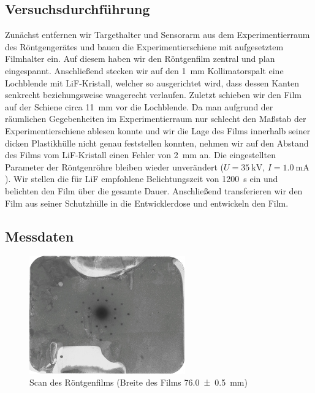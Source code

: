 \documentclass[11pt, a4paper]{article}
\begin{document}
\subsection{Versuchsdurchführung}
Zunächst entfernen wir Targethalter und Sensorarm aus dem Experimentierraum des Röntgengerätes und bauen die Experimentierschiene mit aufgesetztem Filmhalter ein.
Auf diesem haben wir den Röntgenfilm zentral und plan eingespannt.
Anschließend stecken wir auf den \SI{1}{\milli\metre} Kollimatorspalt eine Lochblende mit LiF-Kristall, welcher so ausgerichtet wird, dass dessen Kanten senkrecht beziehungsweise waagerecht verlaufen.
Zuletzt schieben wir den Film auf der Schiene circa \SI{11}{\milli\metre} vor die Lochblende.
Da man aufgrund der räumlichen Gegebenheiten im Experimentierraum nur schlecht den Maßstab der Experimentierschiene ablesen konnte und wir die Lage des Films innerhalb seiner dicken Plastikhülle nicht genau feststellen konnten, nehmen wir auf den Abstand des Films vom LiF-Kristall einen Fehler von \SI{2}{\milli\metre} an.
Die eingestellten Parameter der Röntgenröhre bleiben wieder unverändert ($U = \SI{35}{\kilo\volt}$, $I = \SI{1,0}{\milli\ampere}$).
Wir stellen die für LiF empfohlene Belichtungszeit von \SI{1200}{\second} ein und belichten den Film über die gesamte Dauer.
Anschließend transferieren wir den Film aus seiner Schutzhülle in die Entwicklerdose und entwickeln den Film.

\newpage
\subsection{Messdaten}
\FloatBarrier
\begin{figure}[h!]
\centering
\includegraphics[width=0.60\textwidth]{./grafiken/film.pdf}
\caption{Scan des Röntgenfilms (Breite des Films \SI{76,0 +- 0,5}{\milli\metre})}
\label{fig:film}
\end{figure}
\end{document}
